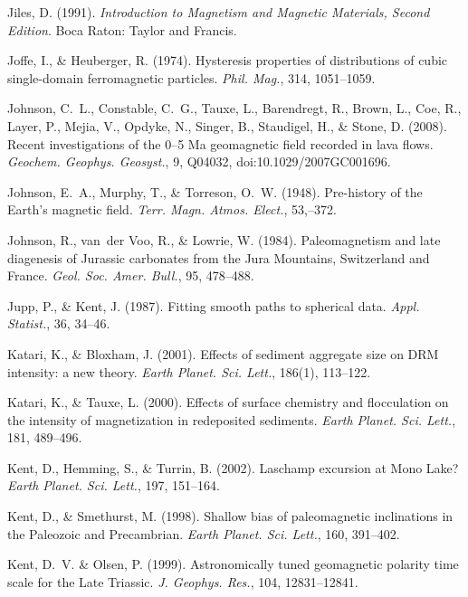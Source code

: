 \documentclass[,plain]{tauxe}
\begin{document}
\begin{thebibliography}{}
\bibitem{}%
Jiles, D. (1991).
{\it Introduction to Magnetism and Magnetic Materials, Second Edition}.
Boca Raton: Taylor and Francis.

\bibitem{}%
Joffe, I., \& Heuberger, R. (1974).
Hysteresis properties of distributions of cubic single-domain ferromagnetic particles.
{\it Phil. Mag.}, 314, 1051--1059.

\bibitem{}%
Johnson, C.~L., Constable, C.~G., Tauxe, L., Barendregt, R., Brown, L., Coe, R., Layer, P., Mejia, V., Opdyke, N., Singer, B., Staudigel, H., \& Stone, D. (2008).
Recent investigations of the 0--5 Ma geomagnetic field recorded in lava flows.
{\it Geochem. Geophys. Geosyst.}, 9, Q04032, doi:10.1029/2007GC001696.

\bibitem{}%
Johnson, E.~A., Murphy, T., \& Torreson, O.~W. (1948).
Pre-history of the Earth's magnetic field.
{\it Terr. Magn. Atmos. Elect.}, 53,--372.

\bibitem{}%
Johnson, R., van~der Voo, R., \& Lowrie, W. (1984).
Paleomagnetism and late diagenesis of Jurassic carbonates from the Jura Mountains, Switzerland and France.
{\it Geol. Soc. Amer. Bull.}, 95, 478--488.

\bibitem{}%
Jupp, P., \& Kent, J. (1987).
Fitting smooth paths to spherical data.
{\it Appl. Statist.}, 36, 34--46.

\bibitem{}%
Katari, K., \& Bloxham, J. (2001).
Effects of sediment aggregate size on DRM intensity: a new theory.
{\it Earth Planet. Sci. Lett.}, 186(1), 113--122.

\bibitem{}%
Katari, K., \& Tauxe, L. (2000).
Effects of surface chemistry and flocculation on the intensity of magnetization in redeposited sediments.
{\it Earth Planet. Sci. Lett.}, 181, 489--496.

\bibitem{}%
Kent, D., Hemming, S., \& Turrin, B. (2002).
Laschamp excursion at Mono Lake?
{\it Earth Planet. Sci. Lett.}, 197, 151--164.

\bibitem{}%
Kent, D., \& Smethurst, M. (1998).
Shallow bias of paleomagnetic inclinations in the Paleozoic and Precambrian.
{\it Earth Planet. Sci. Lett.}, 160, 391--402.

\bibitem{}%
Kent, D.~V. \& Olsen, P. (1999).
Astronomically tuned geomagnetic polarity time scale for the Late Triassic.
{\it J. Geophys. Res.}, 104, 12831--12841.


\end{thebibliography}
\end{document}
